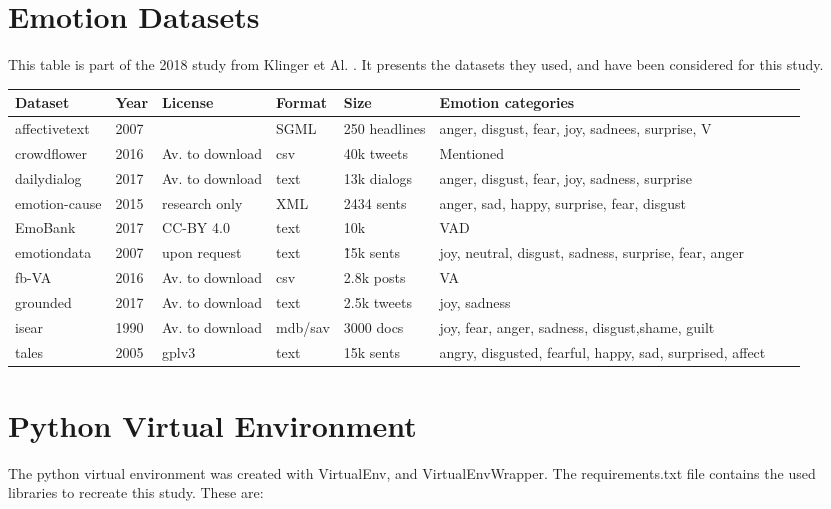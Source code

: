 \section{Emotion Datasets}\label{sec:Emotion Datasets}
This table is part of the 2018 study from Klinger et Al. \cite{klinger2018analysis}. It presents the datasets they used, and have been considered for this study.
\begin{landscape}
  \begin{table}
      \centering
      \begin{tabular}{|l|l|l|l|l|l|l|l|}
      \hline

Dataset       & Year & License         & Format  & Size          & Emotion categories \\
\hline
affectivetext & 2007 &                 & SGML    & 250 headlines & anger, disgust, fear, joy, sadnees, surprise, V \\
crowdflower   & 2016 & Av. to download &  csv    & 40k tweets    & Mentioned \\
dailydialog   & 2017 & Av. to download & text    & 13k dialogs   & anger, disgust, fear, joy, sadness, surprise \\
emotion-cause & 2015 & research only   &  XML    & 2434 sents    & anger, sad, happy, surprise, fear, disgust \\
EmoBank       & 2017 & CC-BY 4.0       & text    & 10k           & VAD \\
emotiondata   & 2007 & upon request    & text    & \~15k sents   & joy, neutral, disgust, sadness, surprise, fear, anger \\
fb-VA         & 2016 & Av. to download &  csv    & 2.8k posts    & VA \\
grounded      & 2017 & Av. to download & text    & 2.5k tweets   & joy, sadness \\
isear         & 1990 & Av. to download & mdb/sav & 3000 docs     & joy, fear, anger, sadness, disgust,shame, guilt \\
tales         & 2005 & gplv3           & text    & 15k sents     & angry, disgusted, fearful, happy, sad, surprised, affect \\
\hline
      \end{tabular}
  \end{table}
\end{landscape}

\section{Python Virtual Environment}\label{sec:Python Virtual Environment}
The python virtual environment was created with VirtualEnv, and VirtualEnvWrapper. The requirements.txt file contains the used libraries to recreate this study. These are:

